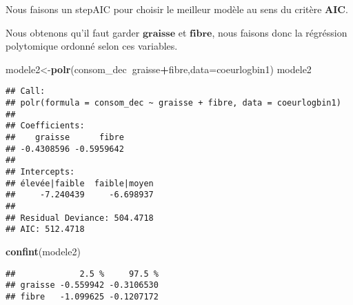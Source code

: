 \documentclass[
]{article}
\newenvironment{Shaded}{\begin{snugshade}}{\end{snugshade}}
\newcommand{\DataTypeTok}[1]{\textcolor[rgb]{0.13,0.29,0.53}{#1}}
\newcommand{\KeywordTok}[1]{\textcolor[rgb]{0.13,0.29,0.53}{\textbf{#1}}}
\newcommand{\NormalTok}[1]{#1}
\newcommand{\OperatorTok}[1]{\textcolor[rgb]{0.81,0.36,0.00}{\textbf{#1}}}
\begin{document}
Nous faisons un stepAIC pour choisir le meilleur modèle au sens du
critère \(\textbf{AIC}\).\\

\begin{Shaded}
\end{Shaded}

Nous obtenons qu'il faut garder \(\textbf{graisse}\) et
\(\textbf{fibre}\), nous faisons donc la régréssion polytomique ordonné
selon ces variables.\\

\begin{Shaded}
\begin{Highlighting}[]
\NormalTok{modele2<-}\KeywordTok{polr}\NormalTok{(consom_dec}\OperatorTok{~}\NormalTok{graisse}\OperatorTok{+}\NormalTok{fibre,}\DataTypeTok{data=}\NormalTok{coeurlogbin1)}
\NormalTok{modele2}
\end{Highlighting}
\end{Shaded}

\begin{verbatim}
## Call:
## polr(formula = consom_dec ~ graisse + fibre, data = coeurlogbin1)
## 
## Coefficients:
##    graisse      fibre 
## -0.4308596 -0.5959642 
## 
## Intercepts:
## élevée|faible  faible|moyen 
##     -7.240439     -6.698937 
## 
## Residual Deviance: 504.4718 
## AIC: 512.4718
\end{verbatim}

\begin{Shaded}
\begin{Highlighting}[]
\KeywordTok{confint}\NormalTok{(modele2)}
\end{Highlighting}
\end{Shaded}

\begin{verbatim}
##             2.5 %     97.5 %
## graisse -0.559942 -0.3106530
## fibre   -1.099625 -0.1207172
\end{verbatim}
\end{document}

